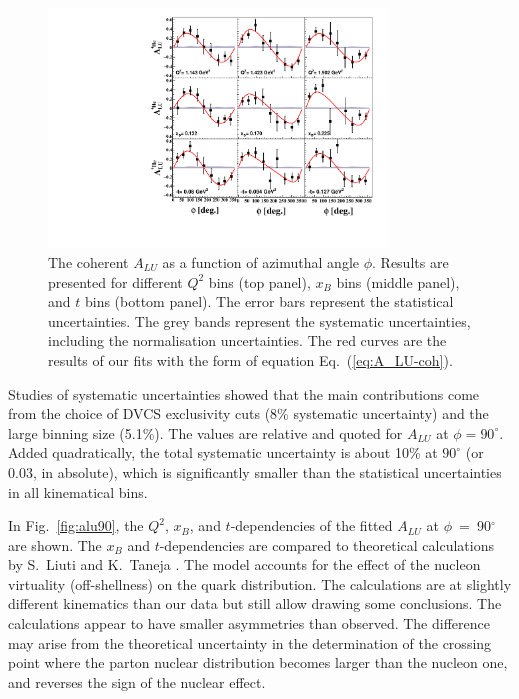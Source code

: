 \documentclass[twocolumn,nofootinbib,showpacs,prl,superscriptaddress,secnumarabic,amssymb,nobibnotes,aps,floatfix]{revtex4}
\begin{document}
\begin{figure}[tb]
\includegraphics[width=9cm]{figs/F_Coherent_ALU_phi.pdf}
\caption{The coherent $A_{LU}$ as a function of azimuthal angle $\phi$. Results are presented
   for different $Q^{2}$ bins (top panel), $x_{B}$ bins (middle panel), and $t$ 
   bins (bottom panel).  The error bars represent the statistical 
   uncertainties. The grey bands represent the systematic uncertainties, 
   including the normalisation uncertainties. The red curves are the results of 
our fits with the form of equation Eq.~(\ref{eq:A_LU-coh}).}
\label{fig:alu}
\end{figure}

Studies of systematic uncertainties showed that the main contributions 
come from the choice of DVCS exclusivity cuts (8\% systematic uncertainty) and the 
large binning size (5.1\%). The values are relative and quoted for $A_{LU}$
at $\phi=90^\circ$. Added quadratically, the total systematic uncertainty
is about 10\% at $90^\circ$ (or 0.03, in absolute), which is significantly smaller
than the statistical uncertainties in all kinematical bins. 

In Fig.~\ref{fig:alu90}, the $Q^2$, $x_{B}$, and $t$-dependencies of the fitted 
$A_{LU}$ at $\phi$~=~90$^{\circ}$ are shown. The $x_{B}$ and $t$-dependencies 
are compared to theoretical calculations by S.~Liuti and K.~Taneja 
\cite{simonetta_2}. The model accounts for the effect of the nucleon virtuality 
(off-shellness) on the quark distribution. The calculations are at slightly 
different kinematics than our data but still allow drawing some conclusions. The 
calculations appear to have smaller asymmetries than observed. 
The difference may arise from the theoretical uncertainty in the determination 
of the crossing point where the parton nuclear distribution becomes larger than the 
nucleon one, and reverses the sign of the nuclear effect.
\end{document}
